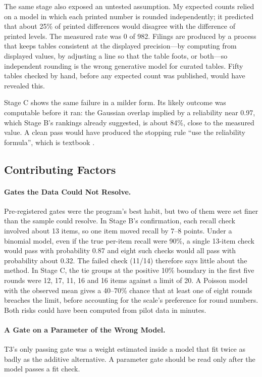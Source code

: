 \documentclass[11pt]{article}
\begin{document}
The same stage also exposed an untested assumption. My expected counts relied on a model in which each printed number is rounded independently; it predicted that about 25\% of printed differences would disagree with the difference of printed levels. The measured rate was 0 of 982. Filings are produced by a process that keeps tables consistent at the displayed precision---by computing from displayed values, by adjusting a line so that the table foots, or both---so independent rounding is the wrong generative model for curated tables. Fifty tables checked by hand, before any expected count was published, would have revealed this.

Stage C shows the same failure in a milder form. Its likely outcome was computable before it ran: the Gaussian overlap implied by a reliability near 0.97, which Stage B's rankings already suggested, is about 84\%, close to the measured value. A clean pass would have produced the stopping rule ``use the reliability formula'', which is textbook \citep{spearman1910correlation,brown1910some}.

\subsection{Contributing Factors}

\paragraph{Gates the Data Could Not Resolve.} Pre-registered gates were the program's best habit, but two of them were set finer than the sample could resolve. In Stage B's confirmation, each recall check involved about 13 items, so one item moved recall by 7--8 points. Under a binomial model, even if the true per-item recall were 90\%, a single 13-item check would pass with probability 0.87 and eight such checks would all pass with probability about 0.32. The failed check (11/14) therefore says little about the method. In Stage C, the tie groups at the positive 10\% boundary in the first five rounds were 12, 17, 11, 16 and 16 items against a limit of 20. A Poisson model with the observed mean gives a 40--70\% chance that at least one of eight rounds breaches the limit, before accounting for the scale's preference for round numbers. Both risks could have been computed from pilot data in minutes.

\paragraph{A Gate on a Parameter of the Wrong Model.} T3's only passing gate was a weight estimated inside a model that fit twice as badly as the additive alternative. A parameter gate should be read only after the model passes a fit check.
\end{document}
